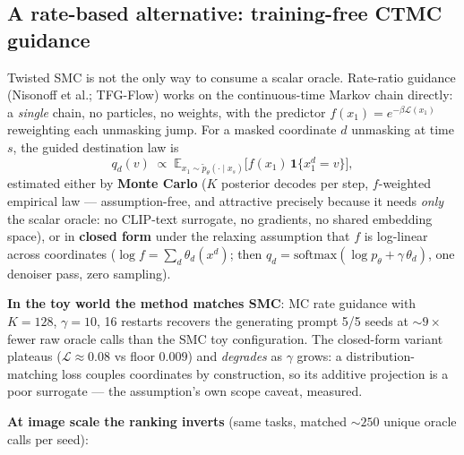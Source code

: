 \documentclass[11pt]{article}
\newcommand{\Ploss}{\mathcal{L}}
\newcommand{\E}{\mathbb{E}}
\begin{document}
\subsection{A rate-based alternative: training-free CTMC guidance}
\label{sec:ctmc}
Twisted SMC is not the only way to consume a scalar oracle. Rate-ratio
guidance (Nisonoff et al.; TFG-Flow) works on the continuous-time Markov
chain directly: a \emph{single} chain, no particles, no weights, with the
predictor $f(x_1) = e^{-\beta \Ploss(x_1)}$ reweighting each unmasking
jump. For a masked coordinate $d$ unmasking at time $s$, the guided
destination law is
\begin{equation}
q_d(v) \;\propto\;
\E_{x_1 \sim \tilde p_\theta(\cdot \mid x_s)}
\!\big[ f(x_1)\, \mathbf{1}\{x_1^d = v\} \big],
\end{equation}
estimated either by \textbf{Monte Carlo} ($K$ posterior decodes per step,
$f$-weighted empirical law --- assumption-free, and attractive precisely
because it needs \emph{only} the scalar oracle: no CLIP-text surrogate, no
gradients, no shared embedding space), or in \textbf{closed form} under
the relaxing assumption that $f$ is log-linear across coordinates
($\log f = \sum_d \theta_d(x^d)$; then $q_d = \mathrm{softmax}(\log
p_\theta + \gamma\,\theta_d)$, one denoiser pass, zero sampling).

\textbf{In the toy world the method matches SMC}: MC rate guidance with
$K{=}128$, $\gamma{=}10$, 16 restarts recovers the generating prompt 5/5
seeds at ${\sim}9\times$ fewer raw oracle calls than the SMC toy
configuration. The closed-form variant plateaus ($\Ploss \approx 0.08$ vs
floor $0.009$) and \emph{degrades} as $\gamma$ grows: a
distribution-matching loss couples coordinates by construction, so its
additive projection is a poor surrogate --- the assumption's own scope
caveat, measured.

\textbf{At image scale the ranking inverts} (same tasks, matched
${\sim}250$ unique oracle calls per seed):
\end{document}
